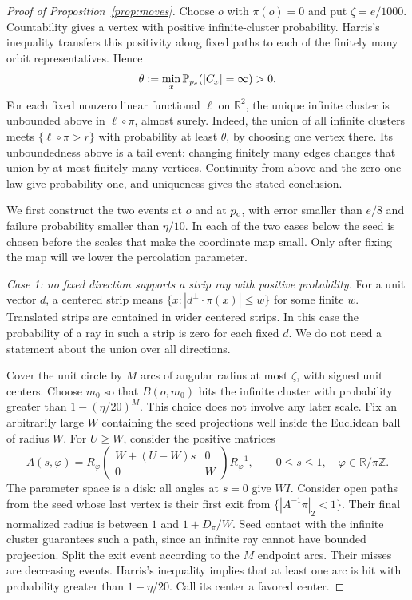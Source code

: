\begin{proof}[Proof of Proposition~\ref{prop:moves}]
Choose $o$ with $\pi(o)=0$ and put $\zeta=e/1000$.
Countability gives a vertex with positive infinite-cluster probability.
Harris's inequality transfers this positivity along fixed paths to each
of the finitely many orbit representatives. Hence
\[
 \theta:=\min_x\mathbb P_{p_c}(|C_x|=\infty)>0.
\]
For each fixed nonzero linear functional \(\ell\) on \(\mathbb R^2\),
the unique infinite cluster is unbounded above in \(\ell\circ\pi\),
almost surely. Indeed, the union of all infinite clusters meets
\(\{\ell\circ\pi>r\}\) with probability at least \(\theta\), by
choosing one vertex there. Its unboundedness above is a tail event:
changing finitely many edges changes that union by at most finitely
many vertices. Continuity from above and the zero-one law give
probability one, and uniqueness gives the stated conclusion.

We first construct the two events at \(o\) and at \(p_c\), with error
smaller than \(e/8\) and failure probability smaller than \(\eta/10\).
In each of the two cases below the seed is chosen before the scales
that make the coordinate map small. Only after fixing the map will we
lower the percolation parameter.

\emph{Case 1: no fixed direction supports a strip ray with positive
probability.} For a unit vector $d$, a centered strip means
$\{x:|d^\perp\cdot\pi(x)|\le w\}$ for some finite $w$. Translated
strips are contained in wider centered strips. In this case the
probability of a ray in such a strip is zero for each fixed $d$.
We do not need a statement about the union over all directions.

Cover the unit circle by $M$ arcs of angular radius at most $\zeta$,
with signed unit centers. Choose $m_0$ so that $B(o,m_0)$ hits the
infinite cluster with probability greater than $1-(\eta/20)^M$.
This choice does not involve any later scale. Fix an arbitrarily large
$W$ containing the seed projections well inside the Euclidean ball of
radius $W$. For $U\ge W$, consider the positive matrices
\[
 A(s,\varphi)=R_\varphi
       \begin{pmatrix}W+(U-W)s&0\\0&W\end{pmatrix}R_\varphi^{-1},
 \qquad 0\le s\le1,\quad\varphi\in\mathbb R/\pi\mathbb Z.
\]
The parameter space is a disk: all angles at $s=0$ give $W I$.
Consider open paths from the seed whose last vertex is their first
exit from $\{|A^{-1}\pi|_2<1\}$. Their final normalized radius is
between $1$ and $1+D_\pi/W$. Seed contact with the infinite cluster
guarantees such a path, since an infinite ray cannot have bounded
projection. Split the exit event according to the $M$ endpoint arcs.
Their misses are decreasing events. Harris's inequality implies that
at least one arc is hit with probability greater than $1-\eta/20$.
Call its center a favored center.


\end{proof}
